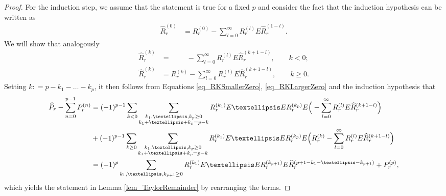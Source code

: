 \documentclass[10pt,a4paper]{amsart}
\begin{document}
\begin{proof}
  For the induction step, we assume that the statement is true for a fixed 
  \( p \) and consider the fact that the induction hypothesis can be written as
  \begin{align}
          \widehat{R}_{r}^{ (0) } 
    & =
          R_{r}^{ (0) } 
        - 
          \sum_{l = 0}^{ \infty } 
          R_{r}^{ (l) } E \widehat{R}_{r}^{ (1 - l) }.
  \end{align}
  We will show that analogously
  \begin{align}
    \label{eq_RKSmallerZero}
          \widehat{R}_{r}^{ (k) } 
    & = 
        \qquad \
        - \sum_{l = 0}^{ \infty } 
          R_{r}^{ (l) } E \widehat{R}_{r}^{ (k + 1 - l) },
        \qquad k < 0;
    \\
    \label{eq_RKLargerZero}
          \widehat{R}_{r}^{ (k) } 
    & = 
          R_{r}^{ (k) } 
        - 
          \sum_{l = 0}^{ \infty } 
          R_{r}^{ (l) } E \widehat{R}_{r}^{ (k + 1 - l) }, 
        \qquad k \ge 0.
  \end{align}
  Setting \( k: = p - k_{1} - \dots - k_{p} \), it then follows from Equations
  \eqref{eq_RKSmallerZero}, \eqref{eq_RKLargerZero} and the induction hypothesis
  that 
  \begin{align}
         \widehat{P}_{r} - \sum_{n = 0}^{p - 1} P_{r}^{ (n) } 
    & =  
         (-1)^{p - 1} \sum_{k < 0} 
         \sum_{ \substack{ k_{1}, \dots, k_{p} \ge 0 \\
                           k_{1} + \dots + k_{p} = p - k 
                         }
              }
         R_{r}^{ ( k_{1} ) } E \dots E R_{r}^{ ( k_{p} ) } E
         \Big( - \sum_{l = 0}^{ \infty } 
                 R_{r}^{ (l) } E \widehat{R}_{r}^{ (k + 1 - l) } 
         \Big)
    \notag
    \\
    & + 
            (-1)^{p - 1} \sum_{k \ge 0} 
            \sum_{ \substack{ k_{1}, \dots, k_{p} \ge 0 \\
                              k_{1} + \dots + k_{p} = p - k 
                            }
              }
            R_{r}^{ ( k_{1} ) } E \dots E R_{r}^{ ( k_{p} ) } E
            \Big( 
              R_{r}^{ (k) } 
            - 
              \sum_{l = 0}^{ \infty } 
              R_{r}^{ (l) } E \widehat{R}_{r}^{ ( k + 1 - l ) } 
            \Big)
    \notag
    \\
    & = 
            (-1)^{p} 
            \sum_{k_{1}, \dots, k_{p + 1} \ge 0} 
            R_{r}^{ ( k_{1} ) } E \dots E R_{r}^{ ( k_{p + 1} ) } E 
            \widehat{R}_{r}^{ (p + 1 - k_{1} - \dots - k_{p + 1}) } 
            +
            P_{r}^{ (p) },
    \notag
  \end{align}
  which yields the statement in Lemma \ref{lem_TaylorRemainder} by rearranging
  the terms.


\end{proof}
\end{document}
